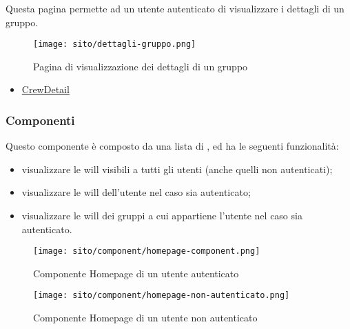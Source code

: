 Questa pagina permette ad un utente autenticato di visualizzare i dettagli di un gruppo. 
\begin{figure}[H] 
    \centerline{\texttt{[image: sito/dettagli-gruppo.png]}} 
    \caption{Pagina di visualizzazione dei dettagli di un gruppo}
\end{figure}
\begin{itemize}
    \item \hyperref[par:CrewDetail]{CrewDetail}
\end{itemize}

\subsubsection{Componenti}
\label{par:HomepageComponent}
Questo componente è composto da una lista di , ed ha le seguenti funzionalità: 
\begin{itemize}
    \item visualizzare le \gls{will} visibili a tutti gli utenti (anche quelli non autenticati);
    \item visualizzare le \gls{will} dell'utente nel caso sia autenticato;
    \item visualizzare le \gls{will} dei gruppi a cui appartiene l'utente nel caso sia autenticato.
\end{itemize}

\begin{figure}[H] 
    \centering 
    \texttt{[image: sito/component/homepage-component.png]} 
    \caption{Componente Homepage di un utente autenticato}
\end{figure}

\begin{figure}[H] 
    \centering 
    \texttt{[image: sito/component/homepage-non-autenticato.png]} 
    \caption{Componente Homepage di un utente non autenticato}
\end{figure}


